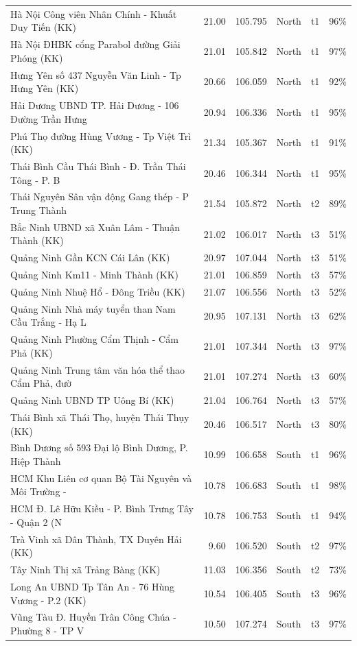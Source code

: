 \documentclass[../DoAn.tex]{subfiles}
\begin{document}
{\begin{longtable}{p{5.5cm}rrllr}
  Hà Nội Công viên Nhân Chính - Khuất Duy Tiến (KK) & 21.00 & 105.795 & North & t1 & 96\% \\
  Hà Nội ĐHBK cổng Parabol đường Giải Phóng (KK) & 21.01 & 105.842 & North & t1 & 97\% \\
  Hưng Yên số 437 Nguyễn Văn Linh - Tp Hưng Yên (KK) & 20.66 & 106.059 & North & t1 & 92\% \\
  Hải Dương UBND TP. Hải Dương - 106 Đường Trần Hưng & 20.94 & 106.336 & North & t1 & 95\% \\
  Phú Thọ đường Hùng Vương - Tp Việt Trì (KK) & 21.34 & 105.367 & North & t1 & 91\% \\
  Thái Bình Cầu Thái Bình - Đ. Trần Thái Tông - P. B & 20.46 & 106.344 & North & t1 & 95\% \\
  Thái Nguyên Sân vận động Gang thép - P Trung Thành & 21.54 & 105.872 & North & t2 & 89\% \\
  Bắc Ninh UBND xã Xuân Lâm - Thuận Thành (KK) & 21.02 & 106.017 & North & t3 & 51\% \\
  Quảng Ninh Gần KCN Cái Lân (KK) & 20.97 & 107.044 & North & t3 & 51\% \\
  Quảng Ninh Km11 - Minh Thành (KK) & 21.01 & 106.859 & North & t3 & 57\% \\
  Quảng Ninh Nhuệ Hổ - Đông Triều (KK) & 21.07 & 106.556 & North & t3 & 52\% \\
  Quảng Ninh Nhà máy tuyển than Nam Cầu Trắng - Hạ L & 20.95 & 107.131 & North & t3 & 62\% \\
  Quảng Ninh Phường Cẩm Thịnh - Cẩm Phả (KK) & 21.01 & 107.344 & North & t3 & 97\% \\
  Quảng Ninh Trung tâm văn hóa thể thao Cẩm Phả, đườ & 21.01 & 107.274 & North & t3 & 60\% \\
  Quảng Ninh UBND TP Uông Bí (KK) & 21.04 & 106.764 & North & t3 & 57\% \\
  Thái Bình xã Thái Thọ, huyện Thái Thụy (KK) & 20.46 & 106.517 & North & t3 & 80\% \\
  Bình Dương số 593 Đại lộ Bình Dương, P. Hiệp Thành & 10.99 & 106.658 & South & t1 & 96\% \\
  HCM Khu Liên cơ quan Bộ Tài Nguyên và Môi Trường - & 10.78 & 106.683 & South & t1 & 98\% \\
  HCM Đ. Lê Hữu Kiều - P. Bình Trưng Tây - Quận 2 (N & 10.78 & 106.753 & South & t1 & 94\% \\
  Trà Vinh xã Dân Thành, TX Duyên Hải (KK) & 9.60 & 106.520 & South & t2 & 97\% \\
  Tây Ninh Thị xã Trảng Bàng (KK) & 11.03 & 106.356 & South & t2 & 73\% \\
  Long An UBND Tp Tân An - 76 Hùng Vương - P.2 (KK) & 10.54 & 106.405 & South & t3 & 96\% \\
  Vũng Tàu Đ. Huyền Trân Công Chúa - Phường 8 - TP V & 10.50 & 107.274 & South & t3 & 97\% \\
\bottomrule
\end{longtable}
}
\end{document}
